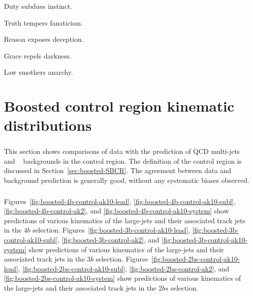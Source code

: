 \begin{savequote}[75mm]
Duty subdues instinct.   

Truth tempers fanaticism.   

Reason exposes deception.   

Grace repels darkness.   

Law smothers anarchy. 
\end{savequote}
\chapter{Boosted control region kinematic distributions}
\label{AppendixCR}

\paragraph{}
This section shows comparisons of data with the prediction of QCD multi-jets and \ttbar~ backgrounds in the control region. 
The definition of the control region is discussed in Section~\ref{sec:boosted-SBCR}.
The agreement between data and background prediction is generally good, without any systematic biases observed.

\paragraph{}
Figures~\ref{fig:boosted-4b-control-ak10-lead}, \ref{fig:boosted-4b-control-ak10-subl}, \ref{fig:boosted-4b-control-ak2}, and \ref{fig:boosted-4b-control-ak10-system} show predictions of various kinematics of the large-\R jets and their associated track jets in the $4b$ selection. 
Figures~\ref{fig:boosted-3b-control-ak10-lead}, \ref{fig:boosted-3b-control-ak10-subl}, \ref{fig:boosted-3b-control-ak2},  and \ref{fig:boosted-3b-control-ak10-system} show predictions of various kinematics of the large-\R jets and their associated track jets in the $3b$ selection. 
Figures~\ref{fig:boosted-2bs-control-ak10-lead}, \ref{fig:boosted-2bs-control-ak10-subl}, \ref{fig:boosted-2bs-control-ak2},  and \ref{fig:boosted-2bs-control-ak10-system} show predictions of various kinematics of the large-\R jets and their associated track jets in the $2bs$ selection.

